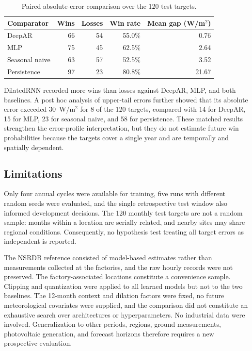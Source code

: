 \documentclass[runningheads]{llncs}
\begin{document}
\begin{table}[H]
\caption{Paired absolute-error comparison over the 120 test targets.}
\label{tab:paired}
\centering
\scriptsize
\setlength{\tabcolsep}{5.0pt}
\begin{tabular}{@{}lrrrr@{}}
\toprule
\textbf{Comparator} & \textbf{Wins} & \textbf{Losses} & \textbf{Win rate} & \textbf{Mean gap (W/m$^2$)} \\
\midrule
DeepAR         & 66 & 54 & 55.0\% & 0.76 \\
MLP            & 75 & 45 & 62.5\% & 2.64 \\
Seasonal naive & 63 & 57 & 52.5\% & 3.52 \\
Persistence    & 97 & 23 & 80.8\% & 21.67 \\
\bottomrule
\end{tabular}
\end{table}

DilatedRNN recorded more wins than losses against DeepAR, MLP, and both baselines. A post hoc analysis of upper-tail errors further showed that its absolute error exceeded 30~W/m$^2$ for 8 of the 120 targets, compared with 14 for DeepAR, 15 for MLP, 23 for seasonal naive, and 58 for persistence. These matched results strengthen the error-profile interpretation, but they do not estimate future win probabilities because the targets cover a single year and are temporally and spatially dependent.

\subsection{Limitations}

Only four annual cycles were available for training, five runs with different random seeds were evaluated, and the single retrospective test window also informed development decisions. The 120 monthly test targets are not a random sample: months within a location are serially related, and nearby sites may share regional conditions. Consequently, no hypothesis test treating all target errors as independent is reported.

The NSRDB reference consisted of model-based estimates rather than measurements collected at the factories, and the raw hourly records were not preserved. The factory-associated locations constitute a convenience sample. Clipping and quantization were applied to all learned models but not to the two baselines. The 12-month context and dilation factors were fixed, no future meteorological covariates were supplied, and the comparison did not constitute an exhaustive search over architectures or hyperparameters. No industrial data were involved. Generalization to other periods, regions, ground measurements, photovoltaic generation, and forecast horizons therefore requires a new prospective evaluation.
\end{document}
